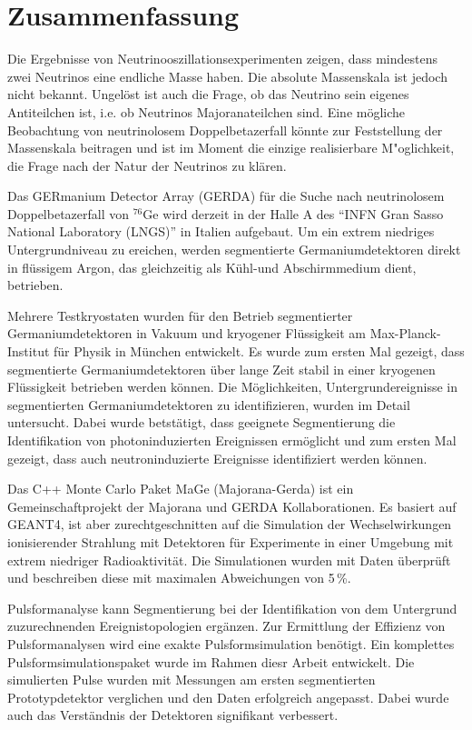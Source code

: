 \clearpage 
 
 
\section*{Zusammenfassung} 

 
Die Ergebnisse von Neutrinooszillationsexperimenten zeigen, dass
mindestens zwei Neutrinos eine endliche Masse haben.  Die absolute
Massenskala ist jedoch nicht bekannt. Ungel\"ost ist auch die Frage,
ob das Neutrino sein eigenes Antiteilchen ist, i.e.  ob Neutrinos
Majoranateilchen sind.  Eine m\"ogliche Beobachtung von neutrinolosem
Doppelbetazerfall k\"onnte zur Feststellung der Massenskala beitragen
und ist im Moment die einzige realisierbare M"oglichkeit, die Frage
nach der Natur der Neutrinos zu kl\"aren.
  
Das GERmanium Detector Array (GERDA) f\"ur die Suche nach
neutrinolosem Doppelbetazerfall von $^{76}$Ge wird derzeit in der
Halle A des ``INFN Gran Sasso National Laboratory (LNGS)'' in Italien
aufgebaut.  Um ein extrem niedriges Untergrundniveau zu ereichen,
werden segmentierte Germaniumdetektoren direkt in fl\"ussigem Argon,
das gleichzeitig als K\"uhl-und Abschirmmedium dient, betrieben.


Mehrere Testkryostaten wurden f\"ur den Betrieb segmentierter
Germaniumdetektoren in Vakuum und kryogener Fl\"ussigkeit am
Max-Planck-Institut f\"ur Physik in M\"unchen entwickelt.  Es wurde
zum ersten Mal gezeigt, dass segmentierte Germaniumdetektoren \"uber
lange Zeit stabil in einer kryogenen Fl\"ussigkeit betrieben werden
k\"onnen.  Die M\"oglichkeiten, Untergrundereignisse in segmentierten
Germaniumdetektoren zu identifizieren, wurden im Detail untersucht.
Dabei wurde betst\"atigt, dass geeignete Segmentierung die
Identifikation von photoninduzierten Ereignissen erm\"oglicht und zum
ersten Mal gezeigt, dass auch neutroninduzierte Ereignisse
identifiziert werden k\"onnen.

Das C++ Monte Carlo Paket MaGe (Majorana-Gerda) ist ein
Gemeinschaftprojekt der Majorana und GERDA Kollaborationen. Es basiert
auf GEANT4, ist aber zurechtgeschnitten auf die Simulation der
Wechselwirkungen ionisierender Strahlung mit Detektoren f\"ur
Experimente in einer Umgebung mit extrem niedriger Radioaktivit\"at.
Die Simulationen wurden mit Daten \"uberpr\"uft und beschreiben diese
mit maximalen Abweichungen von 5\,\%.
                                                                         

Pulsformanalyse kann Segmentierung bei der Identifikation von dem
Untergrund zuzurechnenden Ereignistopologien erg\"anzen.  Zur
Ermittlung der Effizienz von Pulsformanalysen wird eine exakte
Pulsformsimulation ben\"otigt.  Ein komplettes
Pulsformsimulationspaket wurde im Rahmen diesr Arbeit entwickelt.  Die
simulierten Pulse wurden mit Messungen am ersten segmentierten
Prototypdetektor verglichen und den Daten erfolgreich angepasst.
Dabei wurde auch das Verst\"andnis der Detektoren signifikant
verbessert.
 
\clearpage 
 
